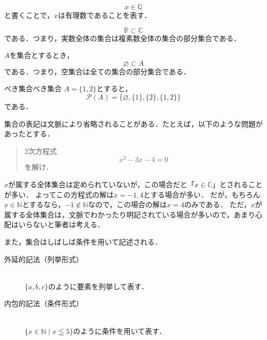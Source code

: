 \documentclass[a4paper,11pt]{ltjsarticle}
\renewcommand{\leq}{\leqq}
\begin{document}
      
      
        \begin{example}{}{}
            \[
            x \in \mathbb{Q}
          \]
          と書くことで，$x$は有理数であることを表す．
        \end{example}
      
        \begin{example}{}{}
            \[
            \mathbb{R} \subset \mathbb{C}
          \]
          である．つまり，実数全体の集合は複素数全体の集合の部分集合である．
        \end{example}
      
        \begin{example}{}{}
          $A$を集合とするとき，
          \[
          \varnothing  \subset A
        \]
        である．つまり，空集合は全ての集合の部分集合である．
      \end{example}
      
        \begin{example}{べき集合}{べき集合}
          $A=\{ 1, 2\}$とすると，
          \[
          \mathcal{P}(A) = \{ \varnothing, \{1\}, \{2\}, \{1, 2\}\}
        \]
        である．
      \end{example}
      
      
      
      集合の表記は文脈により省略されることがある．たとえば，以下のような問題があったとする．
      \begin{quotation}
        2次方程式
        \[
        x^2 - 3x -4 =0
        \]
        を解け．
      \end{quotation}
      $x$が属する全体集合は定められていないが，この場合だと「$x \in \mathbb{C}$」とされることが多い．
      よってこの方程式の解は$x = -1 , 4$とする場合が多い．
      だが，もちろん$ x \in \mathbb{N}$とするなら，$ -1 \notin \mathbb{N}$なので，この場合の解は$ x= 4$のみである．
      ただ，$x$が属する全体集合は，文脈でわかったり明記されている場合が多いので，あまり心配はいらないと筆者は考える．
      
      
      また，集合はしばしば条件を用いて記述される．
      
        \begin{description}
            \item[外延的記法（列挙形式）] \mbox{} \\
            $\{ a, b, c \}$のように要素を列挙して表す．
            \item[内包的記法（条件形式）] \mbox{} \\
            $\{ x \in \mathbb{N} \mid x \leq 5 \}$のように条件を用いて表す．
        \end{description}
      
\end{document}
